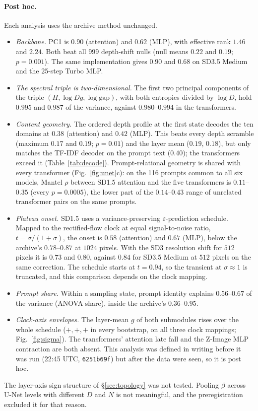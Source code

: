 \documentclass[11pt]{article}
\newcommand{\gap}{\mathrm{gap}}
\begin{document}
\paragraph{Post hoc.} Each analysis uses the archive method unchanged.
\begin{itemize}
 \item \emph{Backbone.} PC1 is $0.90$ (attention) and $0.62$ (MLP), with effective rank $1.46$ and $2.24$. Both beat all 999 depth-shift nulls (null means $0.22$ and $0.19$; $p=0.001$). The same implementation gives $0.90$ and $0.68$ on SD3.5 Medium and the 25-step Turbo MLP.
 \item \emph{The spectral triple is two-dimensional.} The first two principal components of the triple $(H,\log Dg,\log\gap)$, with both entropies divided by $\log D$, hold $0.995$ and $0.987$ of the variance, against $0.980$--$0.994$ in the transformers.
 \item \emph{Content geometry.} The ordered depth profile at the first state decodes the ten domains at $0.38$ (attention) and $0.42$ (MLP). This beats every depth scramble (maximum $0.17$ and $0.19$; $p=0.01$) and the layer mean ($0.19$, $0.18$), but only matches the TF-IDF decoder on the prompt text ($0.40$); the transformers exceed it (Table~\ref{tab:decode}). Prompt-relational geometry is shared with every transformer (Fig.~\ref{fig:unet}c): on the 116 prompts common to all six models, Mantel $\rho$ between SD1.5 attention and the five transformers is $0.11$--$0.35$ (every $p=0.0005$), the lower part of the $0.14$--$0.43$ range of unrelated transformer pairs on the same prompts.
 \item \emph{Plateau onset.} SD1.5 uses a variance-preserving $\varepsilon$-prediction schedule. Mapped to the rectified-flow clock at equal signal-to-noise ratio, $t=\sigma/(1+\sigma)$, the onset is $0.58$ (attention) and $0.67$ (MLP), below the archive's $0.78$--$0.87$ at $1024$ pixels. With the SD3 resolution shift for $512$ pixels it is $0.73$ and $0.80$, against $0.84$ for SD3.5 Medium at $512$ pixels on the same correction. The schedule starts at $t=0.94$, so the transient at $\sigma\approx1$ is truncated, and this comparison depends on the clock mapping.
 \item \emph{Prompt share.} Within a sampling state, prompt identity explains $0.56$--$0.67$ of the variance (ANOVA share), inside the archive's $0.36$--$0.95$.
 \item \emph{Clock-axis envelopes.} The layer-mean $g$ of both submodules rises over the whole schedule ($+,+,+$ in every bootstrap, on all three clock mappings; Fig.~\ref{fig:sigma}). The transformers' attention late fall and the Z-Image MLP contraction are both absent. This analysis was defined in writing before it was run (22:45 UTC, \texttt{6251b69f}) but after the data were seen, so it is post hoc.
\end{itemize}
The layer-axis sign structure of \S\ref{sec:topology} was not tested. Pooling $\beta$ across U-Net levels with different $D$ and $N$ is not meaningful, and the preregistration excluded it for that reason.
\end{document}
